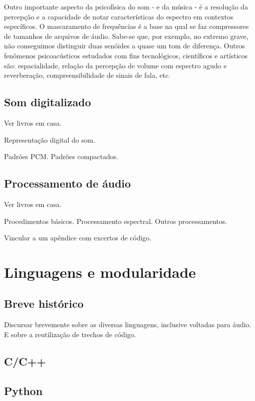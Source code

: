 Outro importante aspecto da psicofísica do som - e da música - é a resolução da percepção
e a capacidade de notar características do espectro em contextos específicos. O mascaramento
de frequências é a base na qual se faz compressores de tamanhos de arquivos de áudio. Sabe-se
que, por exemplo, no extremo grave, não conseguimos distinguir duas senóides a quase um tom de
diferença. Outros fenômenos psicoacústicos estudados com fins tecnológicos, científicos e artísticos são: espacialidade,
relação da percepção de volume com espectro agudo e reverberação, compreensibilidade de sinais de fala, etc.


\subsection{Som digitalizado}

Ver livros em casa.

Representação digital do som.

Padrões PCM. Padrões compactados.

\subsection{Processamento de áudio}

Ver livros em casa.

Procedimentos básicos. Processamento
espectral. Outros processamentos.

Vincular a um apêndice com excertos de código.

\section{Linguagens e modularidade}

\subsection{Breve histórico}

Discursar brevemente sobre as diversas linguagens,
inclusive voltadas para áudio. E sobre a reutilização
de trechos de código.

\subsection{C/C++}

\subsection{Python}



